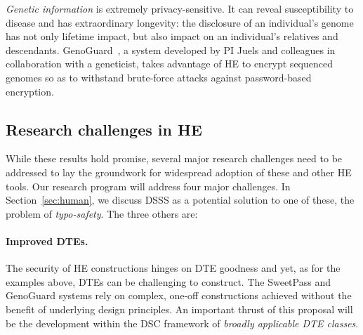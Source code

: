 \vspace{2mm}\noindent
{\em Genetic information} is extremely privacy-sensitive. It can reveal
susceptibility to disease and has extraordinary longevity: the disclosure of an
individual's genome has not only lifetime impact, but also impact on an
individual's  relatives and descendants. GenoGuard~\cite{GenoGuard:2014}, a
system developed by PI Juels and colleagues in collaboration with a geneticist,
takes advantage of HE to encrypt sequenced genomes so as to withstand
brute-force attacks against password-based encryption. 


\subsection{Research challenges in HE}

While these results hold promise, several major research challenges need to
be addressed to lay the groundwork for widespread adoption of these and other HE
tools. Our research program will address four major challenges. In Section~\ref{sec:human}, we discuss DSSS as a potential solution to one of these, the problem of {\em typo-safety}. The three others are:

\paragraph{Improved DTEs.} The security of HE constructions hinges on DTE goodness and yet, as for the examples above, DTEs can be challenging to construct. The SweetPass and GenoGuard systems rely on complex, one-off constructions achieved without the benefit of underlying design principles. An important thrust of this proposal will be the development within the DSC framework of {\em broadly applicable DTE classes}.

